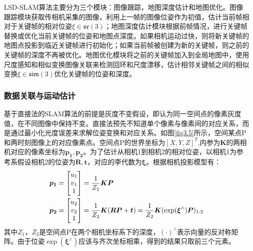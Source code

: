 LSD-SLAM算法主要分为三个模块：图像跟踪，地图深度估计和地图优化。图像跟踪模块获取传相机采集的图像，利用上一帧的图像位姿作为初值，估计当前帧相对于关键帧的相对位姿$\xi \in \mathfrak{se}(3) $；地图深度估计模块根据前帧情况，进行关键帧替换或优化当前关键帧的位姿和地图点深度。如果相机运动过快，则将新关键帧的地图点投影到临近关键帧进行初始化；如果当前帧被创建为新的关键帧，则之前的关键帧的深度不再被优化。地图优化模块将之前的关键帧加入到全局地图中，使用尺度感知和相似变换图像关联来检测回环和尺度漂移，估计相邻关键帧之间的相似变换$\xi \in \mathfrak{sim}(3)$优化关键帧的位姿和深度。

\subsubsection*{数据关联与运动估计}
基于直接法的SLAM算法的前提是灰度不变假设，即认为同一空间点的像素灰度值，在不同图像中保持不变。直接法预先不知道单个像素与像素间的对应关系，而是通过最小化光度误差来求解位姿变换和对应关系。如图\ref{fig3.5}所示，空间某点P和两时刻图像上的对应像素点。空间点P的世界坐标为$[X,Y,Z]^T$,内参为$\boldsymbol{K}$的两相机对应的像素坐标为$\boldsymbol{p_1},\boldsymbol{p_2}$。为了估计从相机1到相机2的相对位姿，以相机1为参考系假设相机2的位姿为$\boldsymbol{R},\boldsymbol{t}$，对应的李代数为$\boldsymbol{\xi}$。根据相机投影模型有：
\begin{equation}
\label{equ3.8}
\begin{aligned}
& \boldsymbol{p_1} = 
\begin{bmatrix}
u_1 \cr v_1 \cr 1 \cr 
\end{bmatrix}
={1 \over Z_1} \boldsymbol{K} \boldsymbol{P}
\\
& \boldsymbol{p_2} = 
\begin{bmatrix}
u_2 \cr v_2 \cr 1 \cr
\end{bmatrix}
={1 \over Z_2} \boldsymbol{K} ( \boldsymbol{R} \boldsymbol{P}+\boldsymbol{t}) = {1 \over Z_2} \boldsymbol{K} ( \exp (\boldsymbol{\xi}^{\wedge}) \boldsymbol{P})_{1:3}
\end{aligned}
\end{equation}
其中$Z_1$，$Z_2$是空间点P在两个相机坐标系下的深度，$(\cdot)^{\wedge}$表示向量的反对称矩阵。由于位姿$\exp(\boldsymbol{\xi}^{\wedge})$应该与齐次坐标相乘，得到的结果只取前三个元素。

